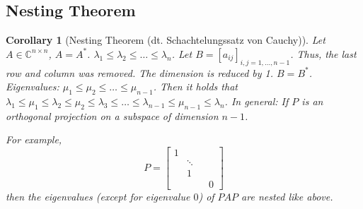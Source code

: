 \documentclass{article}
\newcounter{lecref}[section]
\numberwithin{lecref}{section}
\newtheorem{corollary}[lecref]{Corollary}
\begin{document}
\subsection{Nesting Theorem}

\begin{corollary}[Nesting Theorem (dt. \foreignlanguage{german}{Schachtelungssatz von Cauchy})] %
  Let $A \in \mathbb C^{n \times n}$, $A = A^*$. $\lambda_1 \leq \lambda_2 \leq \dots \leq \lambda_n$.
  Let $B = [a_{ij}]_{i,j=1,\dots,n-1}$. Thus, the last row and column was removed. The dimension is reduced by 1.
  $B = B^*$.
  Eigenvalues: $\mu_1 \leq \mu_2 \leq \dots \leq \mu_{n-1}$.
  Then it holds that $\lambda_1 \leq \mu_1 \leq \lambda_2 \leq \mu_2 \leq \lambda_3 \leq \dots \leq \lambda_{n-1} \leq \mu_{n-1} \leq \lambda_n$.
  In general: If $P$ is an orthogonal projection on a subspace of dimension $n-1$.

  For example,
  \[ P = \begin{bmatrix} 1 & & & \\ & \ddots & & \\ & 1 & & \\ & & & 0 \end{bmatrix} \]
  then the eigenvalues (except for eigenvalue $0$) of $PAP$ are nested like above.
\end{corollary}
\end{document}

